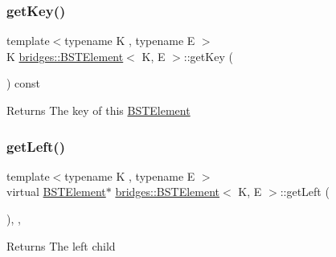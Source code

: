 \mbox{\label{classbridges_1_1_b_s_t_element_ae758ef6696535dadf44eb302b923dbfd}} 
\subsubsection{\texorpdfstring{get\+Key()}{getKey()}}
{\footnotesize\ttfamily template$<$typename K , typename E $>$ \\
K \mbox{\hyperlink{classbridges_1_1_b_s_t_element}{bridges\+::\+B\+S\+T\+Element}}$<$ K, E $>$\+::get\+Key (\begin{DoxyParamCaption}{ }\end{DoxyParamCaption}) const\hspace{0.3cm}{\ttfamily [inline]}}

\begin{DoxyReturn}{Returns}
The key of this \mbox{\hyperlink{classbridges_1_1_b_s_t_element}{B\+S\+T\+Element}} 
\end{DoxyReturn}
\mbox{\label{classbridges_1_1_b_s_t_element_a4d8987373c75b51fca94e3c0b78b87a6}} 
\subsubsection{\texorpdfstring{get\+Left()}{getLeft()}\hspace{0.1cm}{\footnotesize\ttfamily [1/2]}}
{\footnotesize\ttfamily template$<$typename K , typename E $>$ \\
virtual \mbox{\hyperlink{classbridges_1_1_b_s_t_element}{B\+S\+T\+Element}}$\ast$ \mbox{\hyperlink{classbridges_1_1_b_s_t_element}{bridges\+::\+B\+S\+T\+Element}}$<$ K, E $>$\+::get\+Left (\begin{DoxyParamCaption}{ }\end{DoxyParamCaption})\hspace{0.3cm}{\ttfamily [inline]}, {\ttfamily [override]}, {\ttfamily [virtual]}}

\begin{DoxyReturn}{Returns}
The left child 
\end{DoxyReturn}


